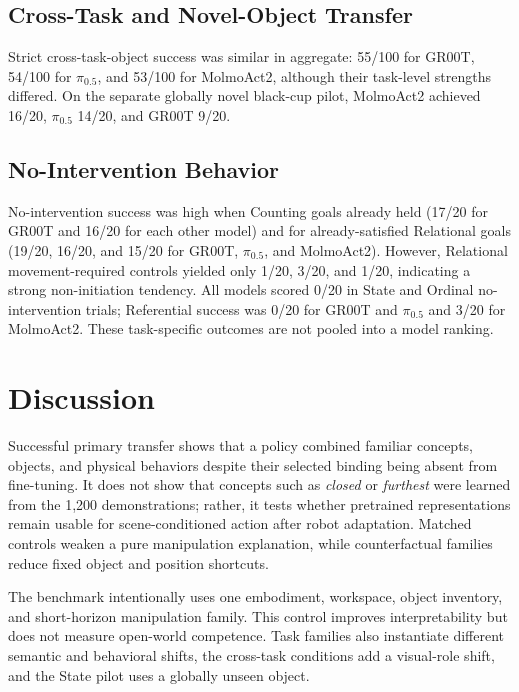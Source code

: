 \documentclass[conference]{IEEEtran}
\begin{document}
\subsection{Cross-Task and Novel-Object Transfer}

Strict cross-task-object success was similar in aggregate: 55/100 for
GR00T, 54/100 for $\pi_{0.5}$, and 53/100 for MolmoAct2, although their
task-level strengths differed. On the separate globally novel black-cup
pilot, MolmoAct2 achieved 16/20, $\pi_{0.5}$ 14/20, and GR00T 9/20.

\subsection{No-Intervention Behavior}

No-intervention success was high when Counting goals already held (17/20
for GR00T and 16/20 for each other model) and for already-satisfied
Relational goals (19/20, 16/20, and 15/20 for GR00T, $\pi_{0.5}$, and
MolmoAct2). However, Relational movement-required controls yielded only
1/20, 3/20, and 1/20, indicating a strong non-initiation tendency. All
models scored 0/20 in State and Ordinal no-intervention trials; Referential
success was 0/20 for GR00T and $\pi_{0.5}$ and 3/20 for MolmoAct2. These
task-specific outcomes are not pooled into a model ranking.

\section{Discussion}

Successful primary transfer shows that a policy combined familiar concepts,
objects, and physical behaviors despite their selected binding being absent
from fine-tuning. It does not show that concepts such as \emph{closed} or
\emph{furthest} were learned from the 1,200 demonstrations; rather, it tests
whether pretrained representations remain usable for scene-conditioned
action after robot adaptation. Matched controls weaken a pure manipulation
explanation, while counterfactual families reduce fixed object and position
shortcuts.

The benchmark intentionally uses one embodiment, workspace, object
inventory, and short-horizon manipulation family. This control improves
interpretability but does not measure open-world competence. Task families
also instantiate different semantic and behavioral shifts, the cross-task
conditions add a visual-role shift, and the State pilot uses a globally
unseen object.
\end{document}

